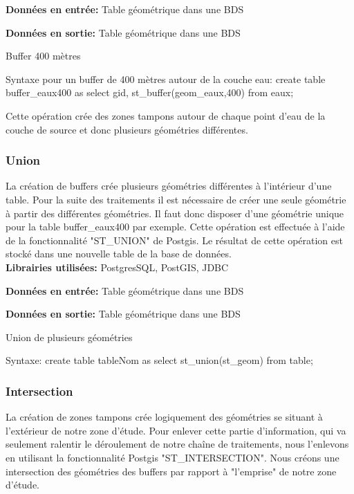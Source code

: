 \textbf{Données en entrée:}  Table géométrique dans une BDS

\textbf{Données en sortie:}  Table géométrique dans une BDS \\


\begin{algorithm}[H]
\caption{\label{traitementbuffer} Buffer 400 mètres}
Syntaxe pour un buffer de 400 mètres autour de la couche eau:
create table buffer\_eaux400 as select gid, st\_buffer(geom\_eaux,400) from eaux;\\
\end{algorithm}

Cette opération crée des zones tampons autour de chaque point d'eau de la couche de source et donc plusieurs géométries différentes.

\subsubsection{Union}

La création de buffers crée plusieurs géométries différentes à l'intérieur d'une table. Pour la suite des traitements il est nécessaire de créer une seule géométrie à partir des différentes géométries. Il faut donc disposer d'une géométrie unique pour la table buffer\_eaux400 par exemple. Cette opération est effectuée à l'aide de la fonctionnalité "ST\_UNION" de Postgis. Le résultat de cette opération est stocké dans une nouvelle table de la base de données. \\

\textbf{Librairies utilisées:} PostgresSQL, PostGIS, JDBC 

\textbf{Données en entrée:}  Table géométrique dans une BDS

\textbf{Données en sortie:}  Table géométrique dans une BDS \\

\begin{algorithm}[H]
\caption{\label{traitementunion} Union de plusieurs géométries}
Syntaxe:
create table tableNom as select st\_union(st\_geom) from table;\\
\end{algorithm}


\subsubsection{Intersection}

La création de zones tampons crée logiquement des géométries se situant à l'extérieur de notre zone d'étude. Pour enlever cette partie d'information, qui va seulement ralentir le déroulement de notre chaîne de traitements, nous l'enlevons en utilisant la fonctionnalité Postgis "ST\_INTERSECTION". Nous créons une intersection des géométries des buffers par rapport à "l'emprise" de notre zone d'étude. 
\\



